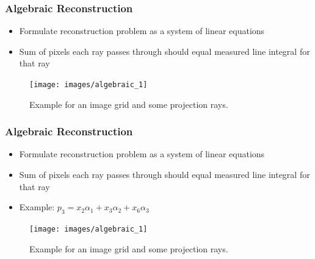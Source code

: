 \begin{frame}
	\frametitle{Algebraic Reconstruction}

	\begin{itemize}
		\item Formulate reconstruction problem as a system of linear equations
		\item Sum of pixels each ray passes through should
		      equal measured line integral for that ray
	\end{itemize}

	\begin{figure}[tbp]
		\centering
		\texttt{[image: images/algebraic\_1]}
		\caption{Example for an image grid and some projection rays.}
		\label{fig:ct_algebraic_1}
	\end{figure}
\end{frame}

\begin{frame}
	\frametitle{Algebraic Reconstruction}

	\begin{itemize}
		\item Formulate reconstruction problem as a system of linear equations
		\item Sum of pixels each ray passes through should equal measured line integral for that ray
		\item Example: $p_3 = x_2 \alpha_1 + x_3 \alpha_2 + x_6 \alpha_3$     
	\end{itemize}

	\begin{figure}[tbp]
		\centering
		\texttt{[image: images/algebraic\_1]}
		\caption{Example for an image grid and some projection rays.}
	\end{figure}
\end{frame}

